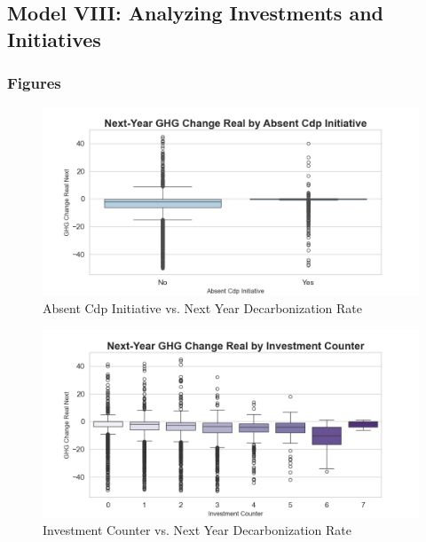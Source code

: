 \subsection{Model VIII: Analyzing Investments and Initiatives}



\subsubsection{Figures}

\begin{figure}[H]
\centering
  \includegraphics[width=\textwidth]{figures/ghg_change_real_next_by_absent_cdp_initiative.png}
\caption{Absent Cdp Initiative vs. Next Year Decarbonization Rate}
\label{fig:ghg_change_real_next_by_absent_cdp_initiative}
\end{figure}

\begin{figure}[H]
\centering
  \includegraphics[width=\textwidth]{figures/ghg_change_real_next_by_investment_counter.png}
\caption{Investment Counter vs. Next Year Decarbonization Rate}
\label{fig:ghg_change_real_next_by_investment_counter}
\end{figure}




